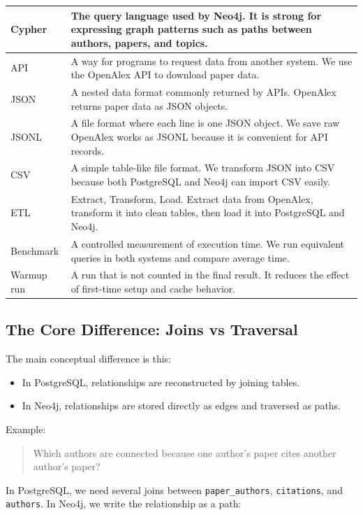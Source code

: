 \documentclass[11pt]{article}
\begin{document}
\begin{longtable}{|p{}|p{}|}
\hline
Cypher & The query language used by Neo4j. It is strong for expressing graph patterns such as paths between authors, papers, and topics. \\
\hline
API & A way for programs to request data from another system. We use the OpenAlex API to download paper data. \\
\hline
JSON & A nested data format commonly returned by APIs. OpenAlex returns paper data as JSON objects. \\
\hline
JSONL & A file format where each line is one JSON object. We save raw OpenAlex works as JSONL because it is convenient for API records. \\
\hline
CSV & A simple table-like file format. We transform JSON into CSV because both PostgreSQL and Neo4j can import CSV easily. \\
\hline
ETL & Extract, Transform, Load. Extract data from OpenAlex, transform it into clean tables, then load it into PostgreSQL and Neo4j. \\
\hline
Benchmark & A controlled measurement of execution time. We run equivalent queries in both systems and compare average time. \\
\hline
Warmup run & A run that is not counted in the final result. It reduces the effect of first-time setup and cache behavior. \\
\hline
\end{longtable}

\subsection{The Core Difference: Joins vs Traversal}

The main conceptual difference is this:

\begin{itemize}
    \item In PostgreSQL, relationships are reconstructed by joining tables.
    \item In Neo4j, relationships are stored directly as edges and traversed as paths.
\end{itemize}

Example:

\begin{quote}
Which authors are connected because one author's paper cites another author's paper?
\end{quote}

In PostgreSQL, we need several joins between \texttt{paper\_authors}, \texttt{citations}, and \texttt{authors}.
In Neo4j, we write the relationship as a path:
\end{document}
